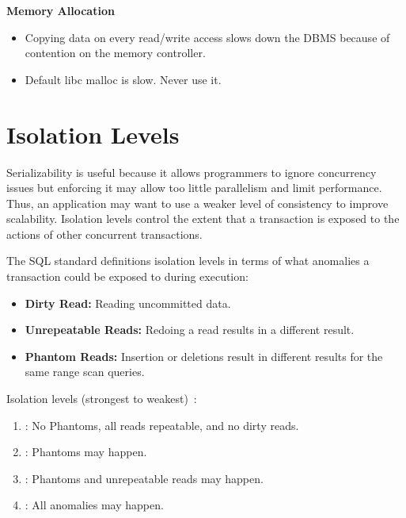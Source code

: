 \documentclass[11pt]{article}
\begin{document}
\textbf{Memory Allocation}
\begin{itemize}
    \item
    Copying data on every read/write access slows down the DBMS because of contention on the memory 
    controller.
    
    \item
    Default libc malloc is slow. Never use it.
\end{itemize}

\section{Isolation Levels}
Serializability is useful because it allows programmers to ignore concurrency issues but 
enforcing it may allow too little parallelism and limit performance. Thus, an application may 
want to use a weaker level of consistency to improve scalability. Isolation levels control the 
extent that a transaction is exposed to the actions of other concurrent transactions.

The SQL standard definitions isolation levels in terms of what anomalies a transaction could be 
exposed to during execution:
\begin{itemize}
    \item \textbf{Dirty Read:}
    Reading uncommitted data.
    
    \item \textbf{Unrepeatable Reads:}
    Redoing a read results in a different result.
    
    \item \textbf{Phantom Reads:}
    Insertion or deletions result in different results for 
    the same range scan queries.
\end{itemize}
    
Isolation levels (strongest to weakest)~\cite{adya00}:
\begin{enumerate}
    \item {}:
    No Phantoms, all reads repeatable, and no dirty reads.
    
    \item {}:
    Phantoms may happen.
    
    \item {}:
    Phantoms and unrepeatable reads may happen.
    
    \item {}:
    All anomalies may happen.
\end{enumerate}
    
\end{document}
